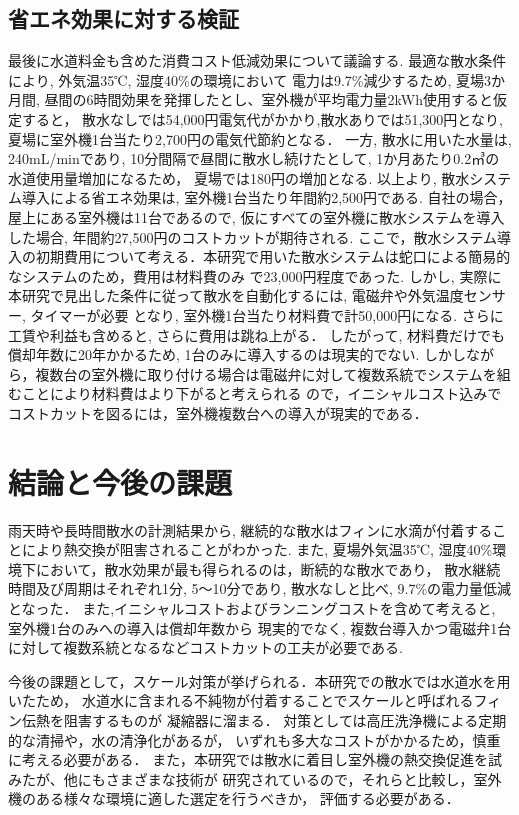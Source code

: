 \documentclass[a4j,fleqn,dvipdfmx,uplatex]{jsarticle}
\begin{document}
\subsection{省エネ効果に対する検証}
最後に水道料金も含めた消費コスト低減効果について議論する. 最適な散水条件により, 外気温35℃, 湿度40\%の環境において
電力は9.7\%減少するため, 夏場3か月間, 昼間の6時間効果を発揮したとし、室外機が平均電力量2kWh使用すると仮定すると，
散水なしでは54,000円電気代がかかり,散水ありでは51,300円となり, 夏場に室外機1台当たり2,700円の電気代節約となる．
一方, 散水に用いた水量は, 240mL/minであり, 10分間隔で昼間に散水し続けたとして, 1か月あたり0.2㎥の水道使用量増加になるため，
夏場では180円の増加となる. 以上より, 散水システム導入による省エネ効果は, 室外機1台当たり年間約2,500円である. 自社の場合，
屋上にある室外機は11台であるので, 仮にすべての室外機に散水システムを導入した場合, 年間約27,500円のコストカットが期待される. 
ここで，散水システム導入の初期費用について考える．本研究で用いた散水システムは蛇口による簡易的なシステムのため，費用は材料費のみ
で23,000円程度であった. しかし, 実際に本研究で見出した条件に従って散水を自動化するには, 電磁弁や外気温度センサー, タイマーが必要
となり, 室外機1台当たり材料費で計50,000円になる. さらに工賃や利益も含めると, さらに費用は跳ね上がる．
したがって, 材料費だけでも償却年数に20年かかるため, 1台のみに導入するのは現実的でない. 
しかしながら，複数台の室外機に取り付ける場合は電磁弁に対して複数系統でシステムを組むことにより材料費はより下がると考えられる
ので，イニシャルコスト込みでコストカットを図るには，室外機複数台への導入が現実的である．


\section{結論と今後の課題}
雨天時や長時間散水の計測結果から, 継続的な散水はフィンに水滴が付着することにより熱交換が阻害されることがわかった. 
また, 夏場外気温35℃, 湿度40\%環境下において，散水効果が最も得られるのは，断続的な散水であり，
散水継続時間及び周期はそれぞれ1分, 5～10分であり, 散水なしと比べ, 9.7\%の電力量低減となった．
また,イニシャルコストおよびランニングコストを含めて考えると, 室外機1台のみへの導入は償却年数から
現実的でなく, 複数台導入かつ電磁弁1台に対して複数系統となるなどコストカットの工夫が必要である. 

今後の課題として，スケール対策が挙げられる．本研究での散水では水道水を用いたため，
水道水に含まれる不純物が付着することでスケールと呼ばれるフィン伝熱を阻害するものが
凝縮器に溜まる．
対策としては高圧洗浄機による定期的な清掃や，水の清浄化\cite{thesis3}があるが，
いずれも多大なコストがかかるため，慎重に考える必要がある． 
また，本研究では散水に着目し室外機の熱交換促進を試みたが、他にもさまざまな技術が
研究されているので，それらと比較し，室外機のある様々な環境に適した選定を行うべきか，
評価する必要がある．
\end{document}
